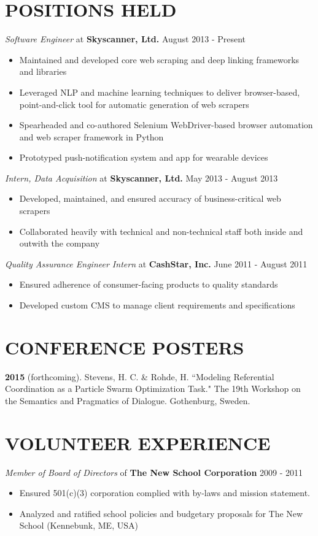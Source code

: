 \documentclass[line, margin]{res}
\begin{document}
\begin{resume}
\section{POSITIONS HELD}
\textit{Software Engineer} at \textbf{Skyscanner, Ltd.} \hfill August 2013 - Present
\begin{itemize}[leftmargin=10pt]
\item Maintained and developed core web scraping and deep linking frameworks and libraries
\item Leveraged NLP and machine learning techniques to deliver browser-based, point-and-click tool for automatic generation of web scrapers
\item Spearheaded and co-authored Selenium WebDriver-based browser automation and web scraper framework in Python
\item Prototyped push-notification system and app for wearable devices
\end{itemize}
\textit{Intern, Data Acquisition} at \textbf{Skyscanner, Ltd.} \hfill May 2013 - August 2013
\begin{itemize}[leftmargin=10pt]
\item Developed, maintained, and ensured accuracy of business-critical web scrapers
\item Collaborated heavily with technical and non-technical staff both inside and outwith the company
\end{itemize}
\textit{Quality Assurance Engineer Intern} at \textbf{CashStar, Inc.} \hfill June 2011 - August 2011
\begin{itemize}[leftmargin=10pt]
\item Ensured adherence of consumer-facing products to quality standards
\item Developed custom CMS to manage client requirements and specifications
\end{itemize}

\section{CONFERENCE POSTERS}
\textbf{2015} (forthcoming). Stevens, H. C. \& Rohde, H. ``Modeling Referential Coordination as a Particle Swarm Optimization Task." The 19th Workshop on the Semantics and Pragmatics of Dialogue. Gothenburg, Sweden.

\section{VOLUNTEER EXPERIENCE}
\textit{Member of Board of Directors} of \textbf{The New School Corporation} \hfill 2009 - 2011
\begin{itemize}[leftmargin=10pt]
\item Ensured 501(c)(3) corporation complied with by-laws and mission statement.
\item Analyzed and ratified school policies and budgetary proposals for The New School (Kennebunk, ME, USA)
\end{itemize}


\end{resume}
\end{document}
